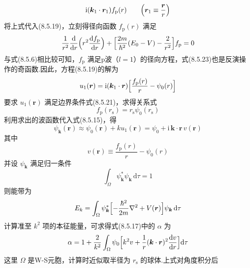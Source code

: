 \begin{equation}
  \mathrm{i}(\boldsymbol{k}_{1}\cdot\boldsymbol{r}_{1})f_{\mathrm{p}}(r)\qquad
  \Bigl(\boldsymbol{r}_{1}\equiv\frac{\boldsymbol{r}}{r}\Bigr)
\end{equation}
将上式代入(8.5.19)，立刻得径向函数 $f_{\mathrm{p}}(r)$ 满足
\begin{equation}
  \frac{1}{r^{2}}\frac{\mathrm{d}}{\mathrm{d}r}\Bigl(r^{2}\frac{\mathrm{d}f_{\mathrm{p}}}{\mathrm{d}r}\Bigr)
  +\Bigl[\frac{2m}{\hbar^{2}}(E_{0}-V)-\frac{2}{r^{2}}\Bigr]f_{\mathrm{p}}=0
\end{equation}
与式(8.5.6)相比较可知，$f_{\mathrm{p}}$ 满足p波（$l=1$）的径向方程，式(8.5.23)也是反演操作的奇函数.因此，方程(8.5.19)的解为
\begin{equation}
  u_{1}(\boldsymbol{r})=\mathrm{i}(\boldsymbol{k}_{1}\cdot\boldsymbol{r})
  \Bigl[\frac{f_{\mathrm{p}}(r)}{r}-\psi_{0}(r)\Bigr]
\end{equation}
要求 $u_{1}(\boldsymbol{r})$ 满足边界条件式(8.5.21)，求得关系式
\begin{equation}
  f_{\mathrm{p}}(r_{\mathrm{s}})=r_{\mathrm{s}}\psi_{0}(r_{\mathrm{s}})
\end{equation}
利用求出的波函数代入式(8.5.15)，得
\begin{equation}
  \psi_{\boldsymbol{k}}(\boldsymbol{r})\approx\psi_{0}(\boldsymbol{r})+ku_{1}(\boldsymbol{r})
  =\psi_{0}+\mathrm{i}\,\boldsymbol{k}\cdot\boldsymbol{r}\,v(\boldsymbol{r})
\end{equation}
其中
\begin{equation}
  v(\boldsymbol{r})\equiv\frac{f_{\mathrm{p}}(r)}{r}-\psi_{0}(r)
\end{equation}
并设 $\psi_{\boldsymbol{k}}$ 满足归一条件
\begin{equation}
  \int_{\Omega}\psi_{\boldsymbol{k}}^{*}\psi_{\boldsymbol{k}}\,\mathrm{d}\tau=1
\end{equation}
则能带为
\begin{equation}
  E_{k}=\int_{\Omega}\psi_{\boldsymbol{k}}^{*}\Bigl[-\frac{\hbar^{2}}{2m}\nabla^{2}+V(\boldsymbol{r})\Bigr]\psi_{\boldsymbol{k}}\,\mathrm{d}\tau
\end{equation}
计算准至 $k^{2}$ 项的本征能量，可求得式(8.5.17)中的 $\alpha$ 为
\begin{equation}
  \alpha=1+\frac{2}{k^{2}}\int_{\Omega}\psi_{0}\Bigl[k^{2}v
  +\frac{1}{r}(\boldsymbol{k}\cdot\boldsymbol{r})^{2}\frac{\mathrm{d}v}{\mathrm{d}r}\Bigr]\mathrm{d}\tau
\end{equation}
这里 $\Omega$ 是W-S元胞，计算时近似取半径为 $r_{\mathrm{s}}$ 的球体.上式对角度积分后
